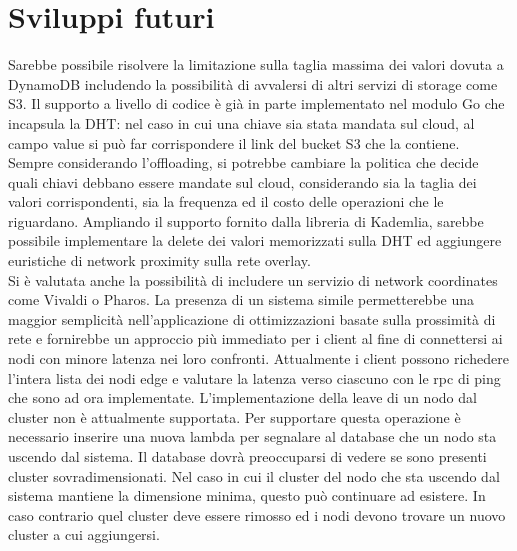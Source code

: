 \documentclass[conference]{IEEEtran}
\begin{document}
\section{Sviluppi futuri}
Sarebbe possibile risolvere la limitazione sulla taglia massima dei valori dovuta a DynamoDB includendo la possibilità di
avvalersi di altri servizi di storage come S3. Il supporto a livello di codice è già in parte implementato nel modulo Go
che incapsula la DHT: nel caso in cui una chiave sia stata mandata sul cloud, al campo value si può far corrispondere il
link del bucket S3 che la contiene.\\
Sempre considerando l'offloading, si potrebbe cambiare la politica che decide quali chiavi debbano essere mandate sul cloud,
considerando sia la taglia dei valori corrispondenti, sia la frequenza ed il costo delle operazioni che le riguardano.
Ampliando il supporto fornito dalla libreria di Kademlia, sarebbe possibile implementare la delete dei valori memorizzati
sulla DHT ed aggiungere euristiche di network proximity sulla rete overlay.\cite{kadRTT}\\
Si è valutata anche la possibilità di includere un servizio di network coordinates come Vivaldi\cite{vivaldi} o Pharos.\cite{pharos}
La presenza di un sistema simile permetterebbe una maggior semplicità nell'applicazione di ottimizzazioni basate sulla
prossimità di rete e fornirebbe un approccio più immediato per i client al fine di connettersi ai nodi con minore latenza
nei loro confronti. Attualmente i client possono richedere l'intera lista dei nodi edge e valutare la latenza verso ciascuno
con le rpc di ping che sono ad ora implementate.
L'implementazione della leave di un nodo dal cluster non è attualmente supportata. Per supportare questa operazione è necessario
inserire una nuova lambda per segnalare al database che un nodo sta uscendo dal sistema. Il database dovrà preoccuparsi di vedere se
sono presenti cluster sovradimensionati. Nel caso in cui il cluster del nodo che sta uscendo dal sistema mantiene la dimensione minima, questo
può continuare ad esistere.
In caso contrario quel cluster deve essere rimosso ed i nodi devono trovare un nuovo cluster a cui aggiungersi.
\end{document}

